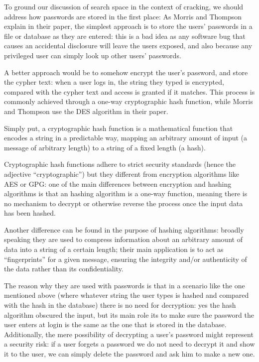 To ground our discussion of search space in the context of cracking, we should address how passwords are stored in the first place: As Morris and Thompson explain in their paper, the simplest approach is to store the users' passwords in a file or database as they are entered: this is a bad idea as any software bug that causes an accidental disclosure will leave the users exposed, and also because any privileged user can simply look up other users' passwords.

A better approach would be to somehow encrypt the user's password, and store the cypher text: when a user logs in, the string they typed is encrypted, compared with the cypher text and access is granted if it matches. This process is commonly achieved through a one-way cryptographic hash function, while Morris and Thompson use the DES algorithm in their paper.

Simply put, a cryptographic hash function is a mathematical function that encodes a string in a predictable way, mapping an arbitrary amount of input (a message of arbitrary length) to a string of a fixed length (a hash). 

Cryptographic hash functions adhere to strict security standards (hence the adjective \enquote{cryptographic}) but they different from encryption algorithms like AES or GPG:
one of the main differences between encryption and hashing algorithms is that an hashing algorithm is a one-way function, meaning there is no mechanism to decrypt or otherwise reverse the process once the input data has been hashed. 

Another difference can be found in the purpose of hashing algorithms: broadly speaking they are used to compress information about an arbitrary amount of data into a string of a certain length; their main application is to act as \enquote{fingerprints} for a given message, ensuring the integrity and/or authenticity of the data rather than its confidentiality.

The reason why they are used with passwords is that in a scenario like the one mentioned above (where whatever string the user types is hashed and compared with the hash in the database) there is no need for decryption: yes the hash algorithm obscured the input, but its main role its to make sure the password the user enters at login is the same as the one that is stored in the database.
Additionally, the mere possibility of decrypting a user's password might represent a security risk: if a user forgets a password we do not need to  decrypt it and show it to the user, we can simply delete the password and ask him to make a new one. 

